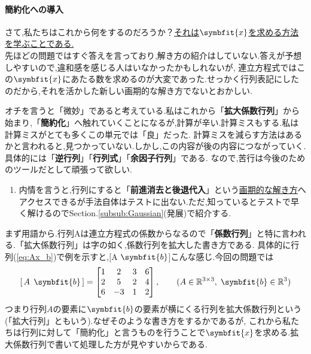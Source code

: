 \paragraph{簡約化への導入}
さて,私たちはこれから何をするのだろうか？\underline{それは$\symbfit{x}$を求める方法を学ぶことである.}\\
先ほどの問題ではすぐ答えを言っており,解き方の紹介はしていない.答えが予想しやすいので,違和感を感じる人はいなかったかもしれないが,
連立方程式ではこの$\symbfit{x}$にあたる数を求めるのが大変であった.せっかく行列表記にしたのだから,それを活かした新しい画期的な解き方でないとおかしい.

オチを言うと「微妙」であると考えている.私はこれから「\textbf{拡大係数行列}」から始まり,「\textbf{簡約化}」へ触れていくことになるが,計算が辛い.計算ミスもする.私は計算ミスがとても多くこの単元では「良」だった.
計算ミスを減らす方法はあるかと言われると,見つかっていない.しかし,この内容が後の内容につながっていく.具体的には「\textbf{逆行列}」「\textbf{行列式}」「\textbf{余因子行列}」である.
なので,苦行は今後のためのツールだとして頑張って欲しい.
\begin{enumerate}[label=※]
    \item 内情を言うと,行列にすると「\textbf{前進消去と後退代入}」という\underline{画期的な解き方}へアクセスできるが手法自体はテストに出ない.ただ,知っているとテストで早く解けるのでSection.\ref{subsub:Gaussian}(発展)で紹介する.
\end{enumerate}
\bigskip

まず用語から.行列Aは連立方程式の係数からなるので「\textbf{係数行列}」と特に言われる.「拡大係数行列」は字の如く,係数行列を拡大した書き方である.
具体的に行列(\ref{eq:Ax_b})で例を示すと,[A $\symbfit{b}$]こんな感じ.今回の問題では\\
\[
[\,A \:\:\symbfit{b}\,]= 
\begin{bmatrix}
    1 & 2 & 3 & 6 \\
    2 & 5 & 2 & 4 \\
    6 & -3 & 1 & 2
\end{bmatrix},\qquad(A\in \mathbb{R}^{3\times3},\;\symbfit{b}\in\mathbb{R}^3)
\]
つまり行列$A$の要素に$\symbfit{b}$の要素が横にくる行列を拡大係数行列という(「拡大行列」ともいう).なぜそのような書き方をするかであるが,
これから私たちは行列に対して「簡約化」と言うものを行うことで$\symbfit{x}$を求める.拡大係数行列で書いて処理した方が見やすいからである.

